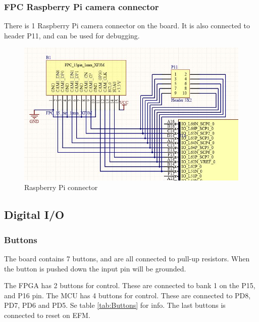 \subsubsection{FPC Raspberry Pi camera connector}
There is 1 Raspberry Pi camera connector on the board. It is also connected to header P11, and can be used for debugging.

\begin{figure}
    \includegraphics[width=\linewidth]{img/fpc_header.jpg}
    \caption{Raspberry Pi connector}
    \label{fig:FpcHeader}
\end{figure}

\subsection{Digital I/O}
\subsubsection{Buttons}
The board contains 7 buttons, and are all connected to pull-up resistors. When the button is pushed down the input pin will be grounded. 

The FPGA has 2 buttons for control. These are connected to bank 1 on the P15, and P16 pin.
The MCU has 4 buttons for control. These are connected to PD8, PD7, PD6 and PD5. Se table \ref{tab:Buttons} for info.
The last buttons is connected to reset on EFM. 

